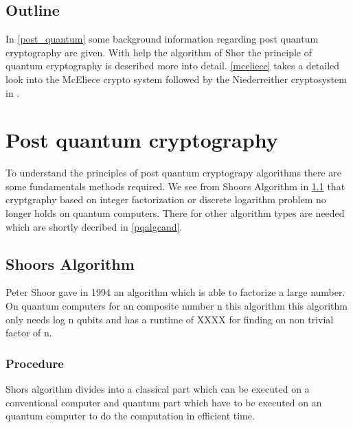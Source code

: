 \subsection*{Outline}
In \autoref{post_quantum} some background information regarding post quantum cryptography are given. With help the algorithm of Shor the principle of quantum cryptography is described more into detail. \autoref{mceliece} takes a detailed look into the McEliece crypto system followed by the Niederreither cryptosystem in . 


\section{Post quantum cryptography}
\label{post_quantum}
To understand the principles of post quantum cryptograpy algorithms there are some fundamentals methods required. We see from Shoors Algorithm in \ref{shoor} that cryptgraphy based on integer factorization or discrete logarithm problem no longer holds on quantum computers. There for other algorithm types are needed which are shortly decribed in \ref{pqalgcand}.   

\subsection{Shoors Algorithm}
\label{shoor}
Peter Shoor gave in 1994 an algorithm which is able to factorize a large number. On quantum computers for an composite number n this algorithm this algorithm only needs log n qubits and has a runtime of XXXX %
for finding on non trivial factor of n. 


\subsubsection{Procedure}
Shors algorithm divides into a classical part which can be executed on a conventional computer and quantum part which have to be executed on an quantum computer to do the computation in efficient time. 

